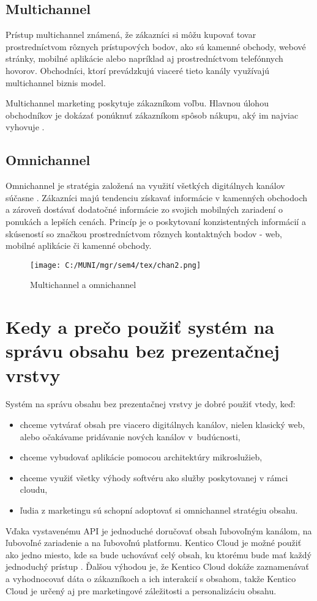 \documentclass[
  printed, %
  table,   %
  lof,     %
  nolot,     %
  twoside,  
]{fithesis3}
\begin{document}
\subsection{Multichannel}
Prístup multichannel známená, že zákazníci si môžu kupovať tovar prostredníctvom rôznych prístupových bodov, ako sú kamenné obchody, webové stránky, mobilné aplikácie alebo napríklad aj prostredníctvom telefónnych hovorov. Obchodníci, ktorí prevádzkujú viaceré tieto kanály využívajú multichannel biznis model.

Multichannel marketing poskytuje zákazníkom voľbu. Hlavnou úlohou obchodníkov je dokázať ponúknuť zákazníkom spôsob nákupu, aký im najviac vyhovuje \cite{multi}.
\subsection{Omnichannel}
Omnichannel je stratégia založená na využití všetkých digitálnych kanálov súčasne \cite{omni}. Zákazníci majú tendenciu získavať informácie v kamenných obchodoch a zároveň dostávať dodatočné informácie zo svojich mobilných zariadení o ponukách a lepších cenách. Princíp je o poskytovaní konzistentných informácií a skúseností so značkou prostredníctvom rôznych kontaktných bodov - web, mobilné aplikácie či kamenné obchody.

\begin{figure}[h]
  \begin{center}
        \texttt{[image: C:/MUNI/mgr/sem4/tex/chan2.png]}
  \end{center}
  \caption{Multichannel a omnichannel \cite{chan}}
  \label{fig:channels}
\end{figure}

\section{Kedy a prečo použiť systém na správu obsahu bez prezentačnej vrstvy}
Systém na správu obsahu bez prezentačnej vrstvy je dobré použiť vtedy, keď:
\begin{itemize}
	\item chceme vytvárať obsah pre viacero digitálnych kanálov, nielen klasický web, alebo očakávame pridávanie nových kanálov v~budúcnosti,
	\item chceme vybudovať aplikácie pomocou architektúry mikro\-služieb,
	\item chceme využiť všetky výhody softvéru ako služby poskytovanej v rámci cloudu,
	\item ľudia z marketingu sú schopní adoptovať si omnichannel stratégiu obsahu.
\end{itemize}
Vďaka vystavenému API je jednoduché doručovať obsah ľubovoľným kanálom, na ľubovoľné zariadenie a na ľubovoľnú platformu. Kentico Cloud je možné použiť ako jedno miesto, kde sa bude uchovávať celý obsah, ku ktorému bude mať každý jednoduchý prístup \cite{cmsGuide}.
Ďalšou výhodou je, že Kentico Cloud dokáže zaznamenávať a vyhodnocovať dáta o zákazníkoch a ich interakcií s obsahom, takže Kentico Cloud je určený aj pre marketingové záležitosti a personalizáciu obsahu.
\end{document}
